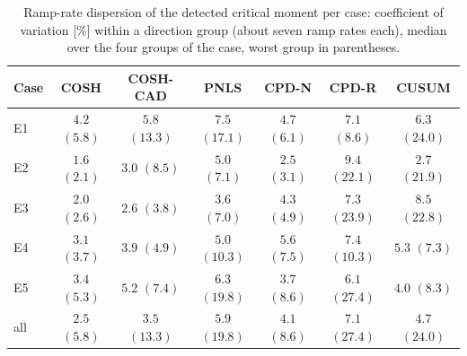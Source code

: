 \begin{table}[t]
\caption{Ramp-rate dispersion of the detected critical
moment per case: coefficient of variation [\%] within a
direction group (about seven ramp rates each), median
over the four groups of the case, worst group in
parentheses.}
\label{tab:cv_case}
\centering\small
\begin{tabular}{@{}lcccccc@{}}
\toprule
Case & COSH & COSH-CAD & PNLS & CPD-N & CPD-R & CUSUM\\
\midrule
E1 & $4.2$ $(5.8)$ & $5.8$ $(13.3)$ & $7.5$ $(17.1)$ & $4.7$ $(6.1)$ & $7.1$ $(8.6)$ & $6.3$ $(24.0)$\\
E2 & $1.6$ $(2.1)$ & $3.0$ $(8.5)$ & $5.0$ $(7.1)$ & $2.5$ $(3.1)$ & $9.4$ $(22.1)$ & $2.7$ $(21.9)$\\
E3 & $2.0$ $(2.6)$ & $2.6$ $(3.8)$ & $3.6$ $(7.0)$ & $4.3$ $(4.9)$ & $7.3$ $(23.9)$ & $8.5$ $(22.8)$\\
E4 & $3.1$ $(3.7)$ & $3.9$ $(4.9)$ & $5.0$ $(10.3)$ & $5.6$ $(7.5)$ & $7.4$ $(10.3)$ & $5.3$ $(7.3)$\\
E5 & $3.4$ $(5.3)$ & $5.2$ $(7.4)$ & $6.3$ $(19.8)$ & $3.7$ $(8.6)$ & $6.1$ $(27.4)$ & $4.0$ $(8.3)$\\
\midrule
all & $2.5$ $(5.8)$ & $3.5$ $(13.3)$ & $5.9$ $(19.8)$ & $4.1$ $(8.6)$ & $7.1$ $(27.4)$ & $4.7$ $(24.0)$\\
\bottomrule
\end{tabular}
\end{table}
